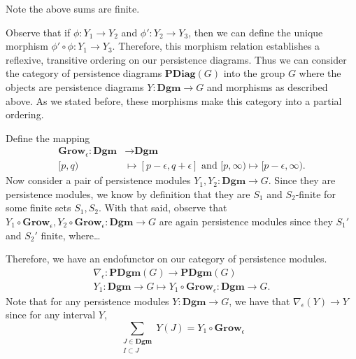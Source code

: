 Note the above sums are finite.

\textcolor{NavyBlue}{Observe that if $\phi: Y_1 \to Y_2$ and $\phi': Y_2 \to Y_3$, 
then we can define the unique morphism $\phi' \circ \phi : Y_1 \to Y_3$. Therefore, 
this morphism relation establishes a reflexive, transitive ordering on our persistence diagrams.} 
Thus we can consider the category of persistence diagrams $\textbf{PDiag}(G)$ into the 
group $G$ where the objects are persistence diagrams $Y: \textbf{Dgm} \to G$ and morphisms 
as described above. As we stated before, these morphisms make this category 
into a partial ordering.

Define the mapping 
\begin{align*}
    \textbf{Grow}_\epsilon: \textbf{Dgm} &\to \textbf{Dgm}\\
    [p, q) &\mapsto [p - \epsilon, q + \epsilon] \text{ and } [p, \infty) \mapsto [p - \epsilon, \infty).
\end{align*}
Now consider a pair of persistence modules $Y_1, Y_2: \textbf{Dgm} \to G$. 
Since they are persistence modules, we know by definition that they are 
$S_1$ and $S_2$-finite for some finite sets $S_1, S_2$. With that said, observe that 
$Y_1 \circ \textbf{Grow}_\epsilon, Y_2 \circ \textbf{Grow}_\epsilon: \textbf{Dgm} \to G$ 
are again persistence modules since they $S_1'$ and $S_2'$ finite, where\dots

Therefore, we have an endofunctor on our category 
of persistence modules.
\begin{align*}
    \nabla_\epsilon : \textbf{PDgm}(G) \to \textbf{PDgm}(G)\\
    Y_1: \textbf{Dgm} \to G \mapsto Y_1 \circ \textbf{Grow}_\epsilon: \textbf{Dgm} \to G.
\end{align*}
Note that for any persistence modules $Y: \textbf{Dgm} \to G$, we have that 
$\nabla_\epsilon(Y) \to Y$ since for any interval $Y$, 
\[
    \sum_{\substack{J \in \textbf{Dgm} \\ I \subset J}}Y(J) 
    =
    Y_1 \circ \textbf{Grow}_\epsilon
\]
